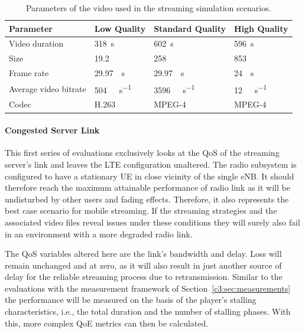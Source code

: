 \begin{table}[htb]
\caption{Parameters of the video used in the streaming simulation scenarios.}
\label{c6:tbl:simulationvideos}
	\centering
	\begin{tabu}{X[1.5,l]X[r]X[r,1.2]X[r]}
		\toprule
		\textbf{Parameter} & \textbf{Low Quality} & \textbf{Standard Quality} & \textbf{High Quality} \\
		\midrule
		Video duration  & \SI{318}{\second} & \SI{602}{\second} & \SI{596}{\second} \\
		Size & \SI{19.2}{\mebi\byte} & \SI{258}{\mebi\byte} & \SI{853}{\mebi\byte}\\
		Frame rate & \SI{29.97}{\per\second} & \SI{29.97}{\per\second} & \SI{24}{\per\second}\\
		Average video bitrate & \SI{504}{\kilo\bit\per\second} & \SI{3596}{\kilo\bit\per\second} & \SI{12}{\mega\bit\per\second} \\
		Codec & H.263 & MPEG-4 & MPEG-4 \\
		\bottomrule
	\end{tabu}
\end{table}


\paragraph{Congested Server Link}

This first series of evaluations exclusively looks at the \gls{QoS} of the streaming server's link and leaves the \gls{LTE} configuration unaltered. The radio subsystem is configured to have a stationary \gls{UE} in close vicinity of the single \gls{eNB}. It should therefore reach the maximum attainable performance of radio link as it will be undisturbed by other users and fading effects. Therefore, it also represents the best case scenario for mobile streaming. If the streaming strategies and the associated video files reveal issues under these conditions they will surely also fail in an environment with a more degraded radio link.

The \gls{QoS} variables altered here are the link's bandwidth and delay. Loss will remain unchanged and at zero, as it will also result in just another source of delay for the reliable streaming process due to retransmission. Similar to the evaluations with the measurement framework of Section~\ref{c3:sec:measurements} the performance will be measured on the basis of the player's stalling characteristics, i.e., the total duration and the number of stalling phases. With this, more complex \gls{QoE} metrics can then be calculated.

